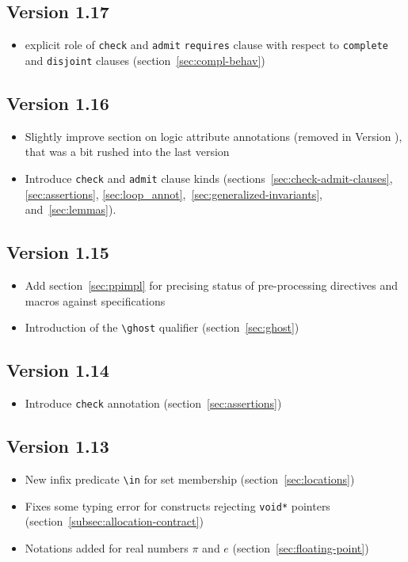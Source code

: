 \subsection{Version 1.17}
\begin{itemize}
\item explicit role of \lstinline|check| and \lstinline|admit| \lstinline|requires|
clause with respect to \lstinline|complete| and \lstinline|disjoint| clauses
(section~\ref{sec:compl-behav})
\end{itemize}
\subsection{Version 1.16}
\begin{itemize}
\item Slightly improve section on logic attribute annotations
(removed in Version \version), that was a bit rushed into
the last version
\item Introduce \lstinline|check| and \lstinline|admit| clause kinds
(sections~\ref{sec:check-admit-clauses}, \ref{sec:assertions},
\ref{sec:loop_annot},~\ref{sec:generalized-invariants}, and~\ref{sec:lemmas}).
\end{itemize}
\subsection{Version 1.15}
\begin{itemize}
\item Add section~\ref{sec:ppimpl} for precising status of pre-processing
  directives and macros against specifications
\item Introduction of the \lstinline|\ghost| qualifier (section~\ref{sec:ghost})
\end{itemize}
\subsection{Version 1.14} %
\begin{itemize}
\item Introduce \lstinline|check| annotation (section~\ref{sec:assertions})
\end{itemize}

\subsection{Version 1.13} %
\begin{itemize}
\item New infix predicate \lstinline|\in| for set membership
  (section~\ref{sec:locations})
\item Fixes some typing error for constructs rejecting
  \lstinline|void*| pointers (section~\ref{subsec:allocation-contract})
\item Notations added for real numbers $\pi$ and $e$
  (section~\ref{sec:floating-point})
\end{itemize}

